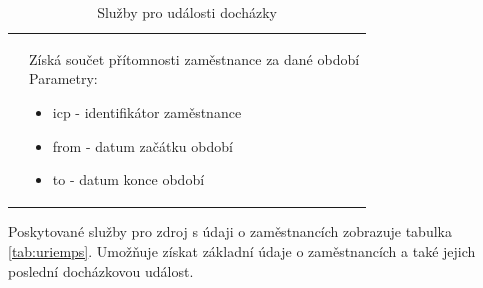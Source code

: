 \documentclass{diplomka}
\begin{document}
\begin{center}
\begin{longtable}[H]{| m{2cm} |  m{10cm} |}
&  \parbox{10cm}{\vspace{5 mm}Získá součet přítomnosti zaměstnance za dané období\\
Parametry:\begin{itemize}[noitemsep,nolistsep]
\item icp - identifikátor zaměstnance
\item from - datum začátku období
\item to - datum konce období
\end{itemize}
\vspace{5 mm}} \\ \hline
\caption{Služby pro události docházky}
\label{tab:urievents}
\end {longtable}
\end{center}

\noindent
Poskytované služby pro zdroj s údaji o zaměstnancích zobrazuje tabulka \ref{tab:uriemps}. Umožňuje získat základní údaje o zaměstnancích a také jejich poslední docházkovou událost.
\end{document}
